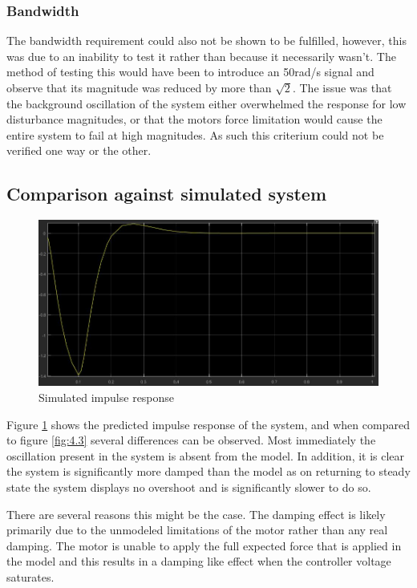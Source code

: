 \documentclass[11pt, a4paper,twocolumn ]{article}
\begin{document}
	\subsubsection{Bandwidth}
The bandwidth requirement could also not be shown to be fulfilled, however, this was due to an inability to test it rather than because it necessarily wasn’t. The method of testing this would have been to introduce an 50rad/s signal and observe that its magnitude was reduced by more than $\sqrt{2}$. The issue was that the background oscillation of the system either overwhelmed the response for low disturbance magnitudes, or that the motors force limitation would cause the entire system to fail at high magnitudes. As such this criterium could not be verified one way or the other.

        \subsection{Comparison against simulated system}\label{subsec:comp}

	\begin{figure}[h!]
	\begin{center}
	\includegraphics[width=\linewidth]{ImpulseSim.jpg}
	\caption{Simulated impulse response}
	\label{fig:4.7}
	\end{center}
	\end{figure}
Figure \ref{fig:4.7} shows the predicted impulse response of the system, and when compared to figure \ref{fig:4.3} several differences can be observed. Most immediately the oscillation present in the system is absent from the model. In addition, it is clear the system is significantly more damped than the model as on returning to steady state the system displays no overshoot and is significantly slower to do so.

There are several reasons this might be the case. The damping effect is likely primarily due to the unmodeled limitations of the motor rather than any real damping. The motor is unable to apply the full expected force that is applied in the model and this results in a damping like effect when the controller voltage saturates.
\end{document}

